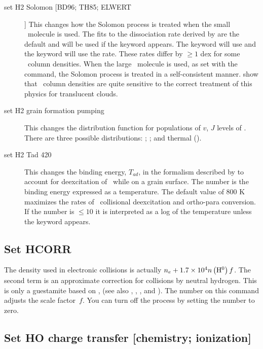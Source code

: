 \begin{description}
\item[set H2 Solomon [BD96; TH85; ELWERT]]  This changes how the Solomon process
is treated when the small \htwo\ molecule is used.  The fits to the dissociation
rate derived by \citet{Elwert2006} are the default and will be used if
the keyword  appears.  The keyword  will use \citet{Bertoldi1996} and the keyword  will use the \citet{Tielens1985a} rate.
These rates differ by $\ge1$ dex for some \htwo\ column densities.  When the large
\htwo\ molecule is used, as set with the  command,
the Solomon
process is treated in a self-consistent manner.
\citet{Abel2004} show
that \htwo\ column densities are quite sensitive to the correct
treatment of this physics for translucent clouds.

\item[set H2 grain formation pumping]  This changes
the distribution function
for populations of $v$, $J$ levels of \htwo.
There are three possible
distributions: \citet[, this is the default]{Takahashi2001};
\citet[]{Draine1996}; and thermal ().

\item[set H2 Tad 420]  This changes the binding energy,
$T_{ad}$, in the formalism
described by \citet{LeBourlot2000} to account for deexcitation
of \htwo\ while on
a grain surface.
The number is the binding energy expressed as a
temperature.
The default value of 800 K maximizes the rates of \htwo\ collisional deexcitation and ortho-para conversion.
If the number is
$\le 10$ it is interpreted as a log of the temperature
unless the keyword  appears.
\end{description}

\subsection{Set HCORR}

The density used in electronic collisions is actually $n_e  + 1.7 \times
10^{4} n\left( {\h0 } \right)f$.
The second term is an approximate correction for collisions by neutral
hydrogen.
This is only a guestamite based on \citet{Drawin1969},
(see also \citealp{Weisheit1974},
\citealp{Steenbock1984}, \citealp{Lambert1993}, and \citealp{Kiselman2000}).
The
number on this command adjusts the scale factor~$f$.
You can turn off the
process by setting the number to zero.

\subsection{Set HO charge transfer [chemistry; ionization]}

